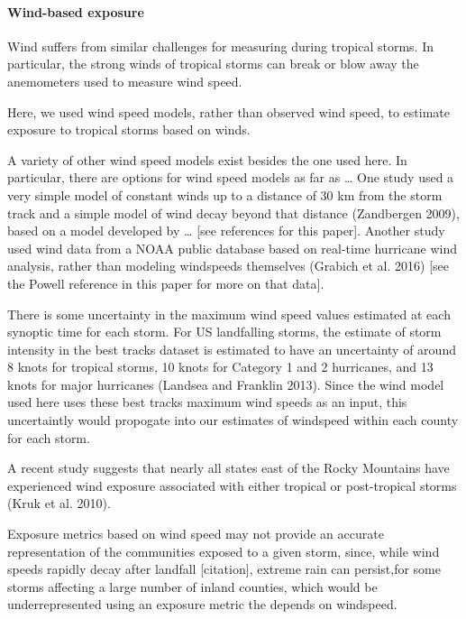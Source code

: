 \documentclass[]{elsarticle} %
\begin{document}
\paragraph{Wind-based exposure}\label{wind-based-exposure-1}

Wind suffers from similar challenges for measuring during tropical
storms. In particular, the strong winds of tropical storms can break or
blow away the anemometers used to measure wind speed.

Here, we used wind speed models, rather than observed wind speed, to
estimate exposure to tropical storms based on winds.

A variety of other wind speed models exist besides the one used here. In
particular, there are options for wind speed models as far as \ldots{}
One study used a very simple model of constant winds up to a distance of
30 km from the storm track and a simple model of wind decay beyond that
distance (Zandbergen 2009), based on a model developed by \ldots{}
{[}see references for this paper{]}. Another study used wind data from a
NOAA public database based on real-time hurricane wind analysis, rather
than modeling windspeeds themselves (Grabich et al. 2016) {[}see the
Powell reference in this paper for more on that data{]}.

There is some uncertainty in the maximum wind speed values estimated at
each synoptic time for each storm. For US landfalling storms, the
estimate of storm intensity in the best tracks dataset is estimated to
have an uncertainty of around 8 knots for tropical storms, 10 knots for
Category 1 and 2 hurricanes, and 13 knots for major hurricanes (Landsea
and Franklin 2013). Since the wind model used here uses these best
tracks maximum wind speeds as an input, this uncertaintly would
propogate into our estimates of windspeed within each county for each
storm.

A recent study suggests that nearly all states east of the Rocky
Mountains have experienced wind exposure associated with either tropical
or post-tropical storms (Kruk et al. 2010).

Exposure metrics based on wind speed may not provide an accurate
representation of the communities exposed to a given storm, since, while
wind speeds rapidly decay after landfall {[}citation{]}, extreme rain
can persist,for some storms affecting a large number of inland counties,
which would be underrepresented using an exposure metric the depends on
windspeed.
\end{document}

